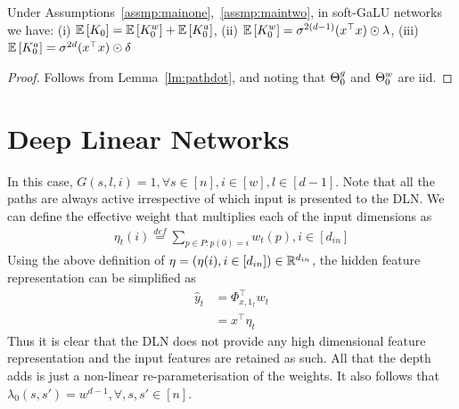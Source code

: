 \begin{lemma} 
Under Assumptions~\ref{assmp:mainone},~\ref{assmp:maintwo}, in soft-GaLU networks we have: (i) $\mathbb{E}\left[K_0\right]=\mathbb{E}\left[K^w_0\right]+\mathbb{E}\left[K^a_0\right]$, 
 (ii) $\mathbb{E}\left[K^w_0\right]=\sigma^{2(d-1)} (x^\top x)\odot \lambda$,  (iii) $\mathbb{E}\left[K^a_0\right]=\sigma^{2d}  (x^\top x)\odot \delta$
\end{lemma}

\begin{proof}
Follows from Lemma~\ref{lm:pathdot}, and noting that ${\Theta}^g_0$ and ${\Theta}^w_0$ are iid.
\end{proof}

\section{Deep Linear Networks}

In this case, $G(s,l,i)=1,\forall s\in[n],i\in[w],l\in[d-1]$. Note that all the paths are always active irrespective of which input is presented to the DLN. We can define the effective weight that multiplies each of the input dimensions as 
\begin{align}
\eta_{t}(i)\stackrel{def}= \sum_{p\in P: p(0)=i} w_{t}(p), i\in [d_{in}]
\end{align}
Using the above definition of $\eta=(\eta(i),i\in[d_{in}])\in \mathbb{R}^{d_{in}}$, the hidden feature representation can be simplified as 
\begin{align}
\hat{y}_t&=\Phi^\top_{x,1_{\dagger}} w_{t} \\&=x^\top \eta_{t}
\end{align}
 Thus it is clear that the DLN does not provide any high dimensional feature representation and the input features are retained as such. All that the depth adds is just a non-linear re-parameterisation of the weights. It also follows that $\lambda_0(s,s')=w^{d-1},\forall ,s,s'\in [n]$.


